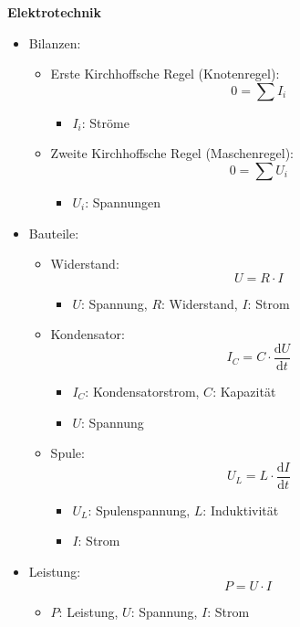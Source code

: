 \documentclass[12pt]{article}
\begin{document}
\textbf{Elektrotechnik}
\begin{itemize}
    \item Bilanzen:
    \begin{itemize}
        \item Erste Kirchhoffsche Regel (Knotenregel):
        \[
        0=\sum I_i
        \]
        \begin{itemize}
            \item \(I_i\): Ströme
        \end{itemize}
        \item Zweite Kirchhoffsche Regel (Maschenregel):
        \[
        0=\sum U_i
        \]
        \begin{itemize}
            \item \(U_i\): Spannungen
        \end{itemize}
    \end{itemize}
    \item Bauteile:
    \begin{itemize}
        \item Widerstand:
        \[
        U=R\cdot I
        \]
        \begin{itemize}
            \item \(U\): Spannung, \(R\): Widerstand, \(I\): Strom
        \end{itemize}
        \item Kondensator:
        \[
        I_C=C\cdot \frac{\mathrm{d}U}{\mathrm{d}t}
        \]
        \begin{itemize}
            \item \(I_C\): Kondensatorstrom, \(C\): Kapazität
            \item \(U\): Spannung
        \end{itemize}
        \item Spule:
        \[
        U_L=L\cdot \frac{\mathrm{d}I}{\mathrm{d}t}
        \]
        \begin{itemize}
            \item \(U_L\): Spulenspannung, \(L\): Induktivität
            \item \(I\): Strom
        \end{itemize}
    \end{itemize}
    \item Leistung:
    \[
    P=U\cdot I
    \]
    \begin{itemize}
        \item \(P\): Leistung, \(U\): Spannung, \(I\): Strom
    \end{itemize}
\end{itemize}
\end{document}
